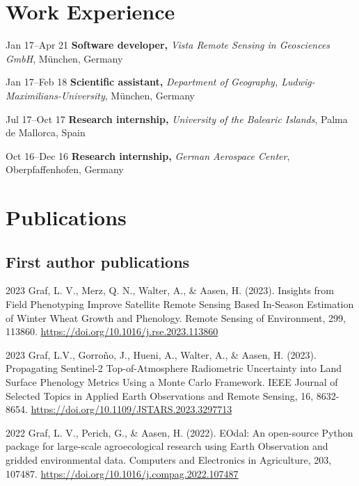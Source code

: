 \begin{cv}{}
\section{Work Experience}
  \begin{cvlist}{}
    \item[Jan 17--Apr 21]
      {\textbf{Software developer, }}{\textit{Vista Remote Sensing in Geosciences GmbH}, München, Germany}
    \item[Jan 17--Feb 18]
      {\textbf{Scientific assistant, }}{\textit{Department of Geography, Ludwig-Maximilians-University}, München, Germany}
    \item[Jul 17--Oct 17]
      {\textbf{Research internship, }}{\textit{University of the Balearic Islands}, Palma de Mallorca, Spain}
    \item[Oct 16--Dec 16]
     {\textbf{Research internship, } }{\textit{German Aerospace Center}, Oberpfaffenhofen, Germany}
  \end{cvlist}


\section{Publications}
\subsection{First author publications}
\begin{cvlist}{}

    \item[2023]
    Graf, L. V., Merz, Q. N., Walter, A., \& Aasen, H. (2023). Insights from Field Phenotyping Improve Satellite Remote Sensing Based In-Season Estimation of Winter Wheat Growth and Phenology. Remote Sensing of Environment, 299, 113860. \url{https://doi.org/10.1016/j.rse.2023.113860}

    \item[2023]
    Graf, L.V., Gorroño, J., Hueni, A., Walter, A., \& Aasen, H. (2023). Propagating Sentinel-2 Top-of-Atmosphere Radiometric Uncertainty into Land Surface Phenology Metrics Using a Monte Carlo Framework. IEEE Journal of Selected Topics in Applied Earth Observations and Remote Sensing, 16, 8632-8654. \url{https://doi.org/10.1109/JSTARS.2023.3297713}

    \item[2022]
    Graf, L. V., Perich, G., \& Aasen, H. (2022). EOdal: An open-source Python package for large-scale agroecological research using Earth Observation and gridded environmental data. Computers and Electronics in Agriculture, 203, 107487. \url{https://doi.org/10.1016/j.compag.2022.107487}


\end{cvlist}
\end{cv}

